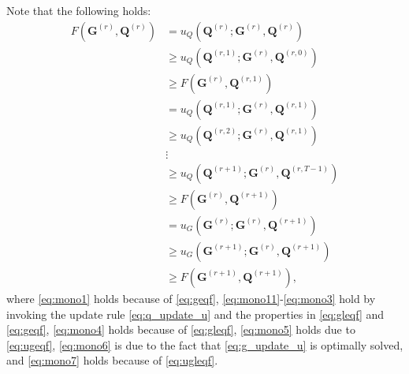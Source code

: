 \documentclass[10pt,journal]{IEEEtran}
\newcommand{\Q}{\boldsymbol{Q}}
\begin{document}
Note that the following holds:
\begin{subequations}\label{eq:mono}
\begin{align}
         F\left({\bm G}^{(r)},{\bm Q}^{(r)}\right) & = u_Q(\Q^{(r)};{\bm G}^{(r)},{\bm Q}^{(r)}) \label{eq:mono1}\\
                                                   & \geq u_Q(\Q^{(r,1)};{\bm G}^{(r)},{\bm Q}^{(r,0)}) \label{eq:mono11}\\
                                                   & \geq F\left({\bm G}^{(r)},{\bm Q}^{(r,1)}\right) \label{eq:mono12}\\
                                                   & = u_Q(\Q^{(r,1)};{\bm G}^{(r)},{\bm Q}^{(r,1)}) \label{eq:mono13}\\
                                                   & \geq u_Q(\Q^{(r,2)};{\bm G}^{(r)},{\bm Q}^{(r,1)}) \label{eq:mono14}\\
                                                   &\vdots\\
                                                   & \geq u_Q(\Q^{(r+1)};{\bm G}^{(r)},{\bm Q}^{(r,T-1)}) \label{eq:mono3}\\
                                                   &\geq F\left({\bm G}^{(r)},{\bm Q}^{(r+1)}\right) \label{eq:mono4}\\
                                                   &= u_G\left({\bm G}^{(r)};{\bm G}^{(r)},{\bm Q}^{(r+1)}\right) \label{eq:mono5}\\
												   &\geq u_G\left({\bm G}^{(r+1)};{\bm G}^{(r)},{\bm Q}^{(r+1)}\right) \label{eq:mono6}\\
												   &\geq F\left({\bm G}^{(r+1)},{\bm Q}^{(r+1)}\right), \label{eq:mono7}
\end{align}
\end{subequations}
where \eqref{eq:mono1} holds because of \eqref{eq:geqf}, \eqref{eq:mono11}-\eqref{eq:mono3} hold by invoking the update rule \eqref{eq:q_update_u} and the properties in \eqref{eq:gleqf} and \eqref{eq:geqf},
\eqref{eq:mono4} holds because of \eqref{eq:gleqf},
\eqref{eq:mono5} holds due to \eqref{eq:ugeqf},
\eqref{eq:mono6} is due to the fact that \eqref{eq:g_update_u} is optimally solved,
and \eqref{eq:mono7} holds because of \eqref{eq:ugleqf}.

\end{document}
